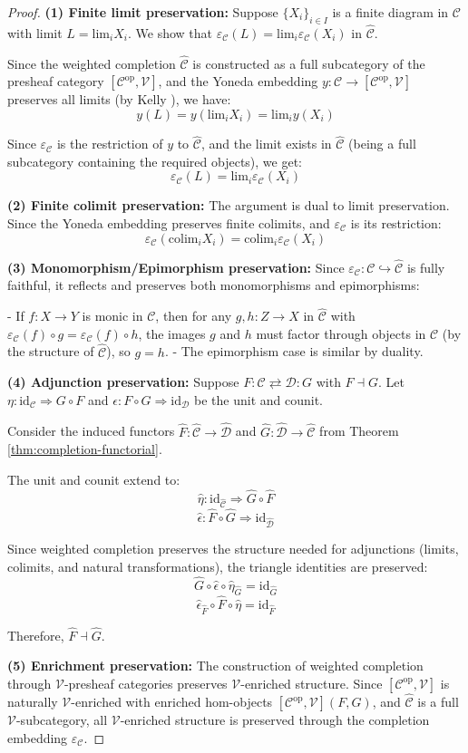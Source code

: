 \documentclass[11pt]{article}
\theoremstyle{plain}
\theoremstyle{definition}
\theoremstyle{remark}
\newcommand{\V}{\mathcal{V}}
\newcommand{\C}{\mathcal{C}}
\newcommand{\D}{\mathcal{D}}
\newcommand{\op}{\mathrm{op}}
\newcommand{\colim}{\mathrm{colim}}
\renewcommand{\lim}{\mathrm{lim}}
\newcommand{\wh}[1]{\widehat{#1}}
\begin{document}
\begin{proof}
\textbf{(1) Finite limit preservation:}
Suppose $\{X_i\}_{i \in I}$ is a finite diagram in $\C$ with limit $L = \lim_i X_i$. We show that $\varepsilon_\C(L) = \lim_i \varepsilon_\C(X_i)$ in $\wh{\C}$.

Since the weighted completion $\wh{\C}$ is constructed as a full subcategory of the presheaf category $[\C^{\op}, \V]$, and the Yoneda embedding $y : \C \to [\C^{\op}, \V]$ preserves all limits (by Kelly \cite{kelly1982basic}), we have:
$$y(L) = y(\lim_i X_i) = \lim_i y(X_i)$$

Since $\varepsilon_\C$ is the restriction of $y$ to $\wh{\C}$, and the limit exists in $\wh{\C}$ (being a full subcategory containing the required objects), we get:
$$\varepsilon_\C(L) = \lim_i \varepsilon_\C(X_i)$$

\textbf{(2) Finite colimit preservation:}
The argument is dual to limit preservation. Since the Yoneda embedding preserves finite colimits, and $\varepsilon_\C$ is its restriction:
$$\varepsilon_\C(\colim_i X_i) = \colim_i \varepsilon_\C(X_i)$$

\textbf{(3) Monomorphism/Epimorphism preservation:}
Since $\varepsilon_\C : \C \hookrightarrow \wh{\C}$ is fully faithful, it reflects and preserves both monomorphisms and epimorphisms:

- If $f : X \to Y$ is monic in $\C$, then for any $g, h : Z \to X$ in $\wh{\C}$ with $\varepsilon_\C(f) \circ g = \varepsilon_\C(f) \circ h$, the images $g$ and $h$ must factor through objects in $\C$ (by the structure of $\wh{\C}$), so $g = h$.
- The epimorphism case is similar by duality.

\textbf{(4) Adjunction preservation:}
Suppose $F : \C \rightleftarrows \D : G$ with $F \dashv G$. Let $\eta : \text{id}_\C \Rightarrow G \circ F$ and $\epsilon : F \circ G \Rightarrow \text{id}_\D$ be the unit and counit.

Consider the induced functors $\wh{F} : \wh{\C} \to \wh{\D}$ and $\wh{G} : \wh{\D} \to \wh{\C}$ from Theorem \ref{thm:completion-functorial}.

The unit and counit extend to:
$$\wh{\eta} : \text{id}_{\wh{\C}} \Rightarrow \wh{G} \circ \wh{F}$$
$$\wh{\epsilon} : \wh{F} \circ \wh{G} \Rightarrow \text{id}_{\wh{\D}}$$

Since weighted completion preserves the structure needed for adjunctions (limits, colimits, and natural transformations), the triangle identities are preserved:
$$\wh{G} \circ \wh{\epsilon} \circ \wh{\eta}_{\wh{G}} = \text{id}_{\wh{G}}$$
$$\wh{\epsilon}_{\wh{F}} \circ \wh{F} \circ \wh{\eta} = \text{id}_{\wh{F}}$$

Therefore, $\wh{F} \dashv \wh{G}$.

\textbf{(5) Enrichment preservation:}
The construction of weighted completion through $\V$-presheaf categories preserves $\V$-enriched structure. Since $[\C^{\op}, \V]$ is naturally $\V$-enriched with enriched hom-objects $[\C^{\op}, \V](F, G)$, and $\wh{\C}$ is a full $\V$-subcategory, all $\V$-enriched structure is preserved through the completion embedding $\varepsilon_\C$.
\end{proof}
\end{document}
